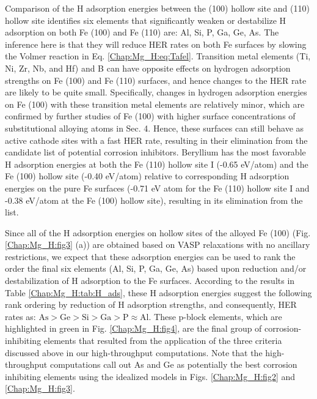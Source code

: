 Comparison of the H adsorption energies between the (100) hollow site and (110) hollow site identifies six elements that significantly weaken or destabilize H adsorption on both Fe (100) and Fe (110) are: Al, Si, P, Ga, Ge, As. The inference here is that they will reduce \ac{HER} rates on both Fe surfaces by slowing the Volmer reaction in Eq. \ref{Chap:Mg_H:eq:Tafel}. Transition metal elements (Ti, Ni, Zr, Nb, and Hf) and B can have opposite effects on hydrogen adsorption strengths on Fe (100) and Fe (110) surfaces, and hence changes to the \ac{HER} rate are likely to be quite small. Specifically, changes in hydrogen adsorption energies on Fe (100) with these transition metal elements are relatively minor, which are confirmed by further studies of Fe (100) with higher surface concentrations of substitutional alloying atoms in Sec. 4. Hence, these surfaces can still behave as active cathode sites with a fast \ac{HER} rate, resulting in their elimination from the candidate list of potential corrosion inhibitors. Beryllium has the most favorable H adsorption energies at both the Fe (110) hollow site I (-0.65 eV/atom) and the Fe (100) hollow site (-0.40 eV/atom) relative to corresponding H adsorption energies on the pure Fe surfaces (-0.71 eV atom for the Fe (110) hollow site I and -0.38 eV/atom at the Fe (100) hollow site), resulting in its elimination from the list.


Since all of the H adsorption energies on hollow sites of the alloyed Fe (100) (Fig. \ref{Chap:Mg_H:fig3} (a)) are obtained based on VASP relaxations with no ancillary restrictions, we expect that these adsorption energies can be used to rank the order the final six elements (Al, Si, P, Ga, Ge, As) based upon reduction and/or destabilization of H adsorption to the Fe surfaces. According to the results in Table \ref{Chap:Mg_H:tab:H_ads}, these H adsorption energies suggest the following rank ordering by reduction of H adsorption strengths, and consequently, HER rates as: $\text{As} > \text{Ge} > \text{Si} > \text{Ga} > \text{P} \approx \text{Al}$. These p-block elements, which are highlighted in green in Fig. \ref{Chap:Mg_H:fig4}, are the final group of corrosion-inhibiting elements that resulted from the application of the three criteria discussed above in our high-throughput computations. Note that the high-throughput computations call out As and Ge as potentially the best corrosion inhibiting elements using the idealized models in Figs. \ref{Chap:Mg_H:fig2} and \ref{Chap:Mg_H:fig3}.


